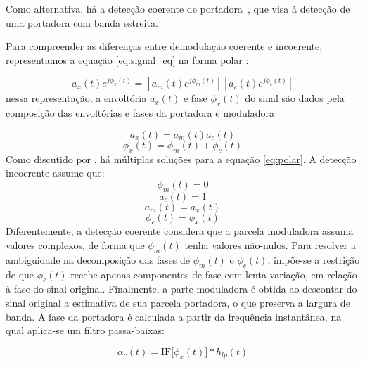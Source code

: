 Como alternativa, há
a detecção coerente de portadora~\cite{atlas2005,clark2009time,clark2009sum},
que visa à detecção de uma portadora com banda estreita.

Para compreender as diferenças entre demodulação coerente e incoerente,
representamos a equação \ref{eq:signal_eq} na forma polar \cite{schimmel2007}:

\begin{equation}  \label{eq:polar}
    a_x(t) e^{j \phi_x(t)} = \left[ a_m(t) e^{j \phi_m(t)} \right] \left[ a_c(t) e^{j \phi_c(t)}\right]
\end{equation}
nessa representação, a envoltória $a_x(t)$ e fase $\phi_x(t)$ do sinal são dados
pela composição das envoltórias e fases da portadora e moduladora

\begin{equation}
    a_x(t) = a_m(t) a_c(t)
\end{equation}
\begin{equation}
    \phi_x(t) = \phi_m(t) + \phi_c(t)    
\end{equation}
Como discutido por \citet{cohen1999ambiguity}, há múltiplas soluções
para a equação \ref{eq:polar}. A detecção incoerente assume que:
\begin{equation}
    \phi_m(t) = 0
\end{equation}
\begin{equation}
    a_c(t) = 1
\end{equation}
\begin{equation}
    a_m(t) = a_x(t)
\end{equation}
\begin{equation}
    \phi_c(t) = \phi_x(t)
\end{equation}
Diferentemente, a detecção coerente considera que a parcela moduladora assuma
valores complexos, de forma que $\phi_m(t)$ tenha valores não-nulos. Para
resolver a ambiguidade na decomposição das fases de $\phi_m(t)$ e $\phi_c(t)$,
impõe-se a restrição de que $\phi_c(t)$ recebe apenas componentes de fase com
lenta variação, em relação à fase do sinal original. Finalmente, a parte
moduladora é obtida ao descontar do sinal original a estimativa de sua parcela
portadora, o que preserva a largura de banda. A fase da portadora é calculada a
partir da frequência instantânea, na qual aplica-se um filtro passa-baixas:

\begin{equation}
    \alpha_c(t) = \mathrm{IF}\lbrack\phi_x(t)\rbrack * h_{lp}(t)
\end{equation}



